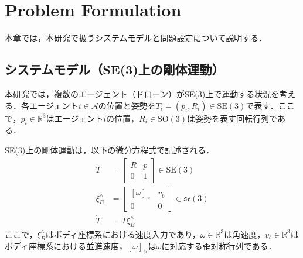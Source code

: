 \section{Problem Formulation}

本章では，本研究で扱うシステムモデルと問題設定について説明する．

\subsection{システムモデル（SE(3)上の剛体運動）}

本研究では，複数のエージェント（ドローン）がSE(3)上で運動する状況を考える．各エージェント$i \in \mathcal{A}$の位置と姿勢を$T_i = (p_i, R_i) \in \mathrm{SE}(3)$で表す．ここで，$p_i \in \mathbb{R}^3$はエージェント$i$の位置，$R_i \in \mathrm{SO}(3)$は姿勢を表す回転行列である．

SE(3)上の剛体運動は，以下の微分方程式で記述される．
\begin{equation}
\begin{aligned}
T &= \begin{bmatrix}
R & p \\
0 & 1
\end{bmatrix} \in \mathrm{SE}(3) \\
\xi^\wedge_B &= \begin{bmatrix}
[\omega]_\times & v_b \\
0 & 0
\end{bmatrix} \in \mathfrak{se}(3) \\
\dot{T} &= T \xi^\wedge_B
\label{eq:se3_dynamics}
\end{aligned}
\end{equation}
ここで，$\xi^\wedge_B$はボディ座標系における速度入力であり，$\omega \in \mathbb{R}^3$は角速度，$v_b \in \mathbb{R}^3$はボディ座標系における並進速度，$[\omega]_\times$は$\omega$に対応する歪対称行列である．

